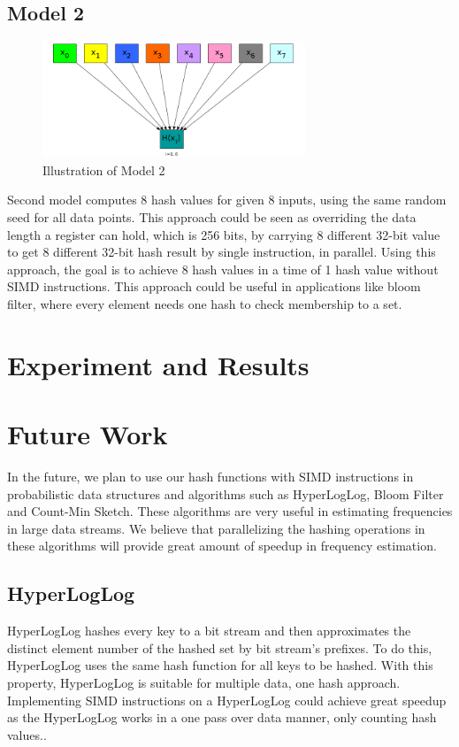 \documentclass[11pt,oneside,a4paper]{article}
\begin{document}
\subsection{Model 2}
\begin{figure}[H]
\centering		
\includegraphics[width=0.7\textwidth]{multi_data_single_hash.png} 
\caption{Illustration of Model 2}
\end{figure}
Second model computes 8 hash values for given 8 inputs, using the same random seed for all data points. This approach could be seen as overriding the data length a register can hold, which is 256 bits, by carrying 8 different 32-bit value to get 8 different 32-bit hash result by single instruction, in parallel. Using this approach, the goal is to achieve 8 hash values in a time of 1 hash value without SIMD instructions. This approach could be useful in applications like bloom filter, where every element needs one hash to check membership to a set.
\section{Experiment and Results}
\section{Future Work}
In the future, we plan to use our hash functions with SIMD instructions in probabilistic data structures and algorithms such as HyperLogLog, Bloom Filter and Count-Min Sketch. These algorithms are very useful in estimating frequencies in large data streams.  We believe that parallelizing the hashing operations in these algorithms  will provide great amount of speedup in frequency estimation. 
\subsection{HyperLogLog}
HyperLogLog hashes every key to a bit stream and then approximates the distinct element number of the hashed set by bit stream's prefixes. To do this, HyperLogLog uses the same hash function for all keys to be hashed. With this property, HyperLogLog is suitable for multiple data, one hash approach. 
Implementing SIMD instructions on a HyperLogLog could achieve great speedup as the HyperLogLog works in a one pass over data manner, only counting hash values..  
\end{document}

